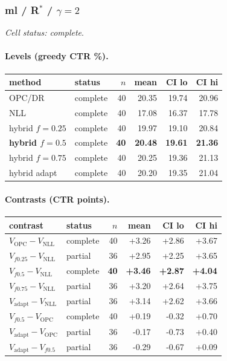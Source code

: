 \documentclass[10pt,a4paper]{article}
\begin{document}
\subsubsection{ml / R$^*$ / $\gamma=2$}
\emph{Cell status: complete}.
\paragraph{Levels (greedy CTR \%).}
{\centering\small\begin{tabular}{llrrrr}
\toprule method & status & $n$ & mean & CI lo & CI hi \\
\midrule
OPC/DR & complete & 40 & 20.35 & 19.74 & 20.96 \\
NLL & complete & 40 & 17.08 & 16.37 & 17.78 \\
hybrid $f{=}0.25$ & complete & 40 & 19.97 & 19.10 & 20.84 \\
\textbf{hybrid $f{=}0.5$} & complete & \textbf{40} & \textbf{20.48} & \textbf{19.61} & \textbf{21.36} \\
hybrid $f{=}0.75$ & complete & 40 & 20.25 & 19.36 & 21.13 \\
hybrid adapt & complete & 40 & 20.20 & 19.35 & 21.04 \\
\bottomrule\end{tabular}\par}
\paragraph{Contrasts (CTR points).}
{\centering\small\begin{tabular}{llrrrr}
\toprule contrast & status & $n$ & mean & CI lo & CI hi \\
\midrule
$V_{\mathrm{OPC}}-V_{\mathrm{NLL}}$ & complete & 40 & +3.26 & +2.86 & +3.67 \\
$V_{f0.25}-V_{\mathrm{NLL}}$ & partial & 36 & +2.95 & +2.25 & +3.65 \\
\textbf{$V_{f0.5}-V_{\mathrm{NLL}}$} & complete & \textbf{40} & \textbf{+3.46} & \textbf{+2.87} & \textbf{+4.04} \\
$V_{f0.75}-V_{\mathrm{NLL}}$ & partial & 36 & +3.20 & +2.64 & +3.75 \\
$V_{\mathrm{adapt}}-V_{\mathrm{NLL}}$ & partial & 36 & +3.14 & +2.62 & +3.66 \\
$V_{f0.5}-V_{\mathrm{OPC}}$ & complete & 40 & +0.19 & -0.32 & +0.70 \\
$V_{\mathrm{adapt}}-V_{\mathrm{OPC}}$ & partial & 36 & -0.17 & -0.73 & +0.40 \\
$V_{\mathrm{adapt}}-V_{f0.5}$ & partial & 36 & -0.29 & -0.67 & +0.09 \\
\bottomrule\end{tabular}\par}
\end{document}
